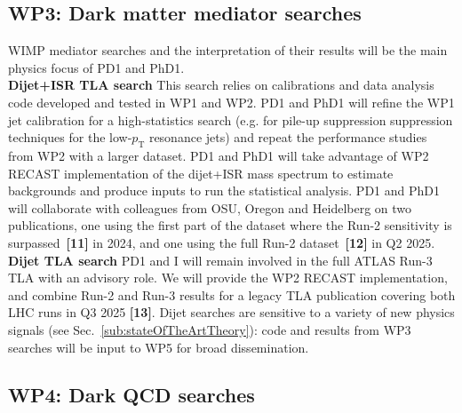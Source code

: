 \subsection{WP3: Dark matter mediator searches}

WIMP mediator searches and the interpretation of their results will be the main physics focus of PD1 and PhD1.\\ \indent
\textbf{Dijet+ISR TLA search} This search relies on calibrations and data analysis code developed and tested in WP1 and WP2.
PD1 and PhD1 will refine the WP1 jet calibration for a high-statistics search (e.g. for pile-up suppression suppression techniques for the low-$p_{\mathrm{T}}$ resonance jets) and repeat the performance studies from WP2 with a larger dataset. 
PD1 and PhD1 will take advantage of WP2 RECAST implementation of the dijet+ISR mass spectrum to estimate backgrounds and produce inputs to run the statistical analysis.
PD1 and PhD1 will collaborate with colleagues from OSU, Oregon and Heidelberg on two publications, one using the first part of the dataset where the Run-2 sensitivity is surpassed~\textbf{[11]} in 2024, and one using the full Run-2 dataset~\textbf{[12]} in Q2 2025.\\ 
\textbf{Dijet TLA search} PD1 and I will remain involved in the full ATLAS Run-3 TLA with an advisory role. 
We will provide the WP2 RECAST implementation, and combine Run-2 and Run-3 results for a legacy TLA publication covering both LHC runs in Q3 2025 \textbf{[13]}. 
Dijet searches are sensitive to a variety of new physics signals (see Sec.~\ref{sub:stateOfTheArtTheory}): code and results from WP3 searches will be input to WP5 for broad dissemination. 

\subsection{WP4: Dark QCD searches}

